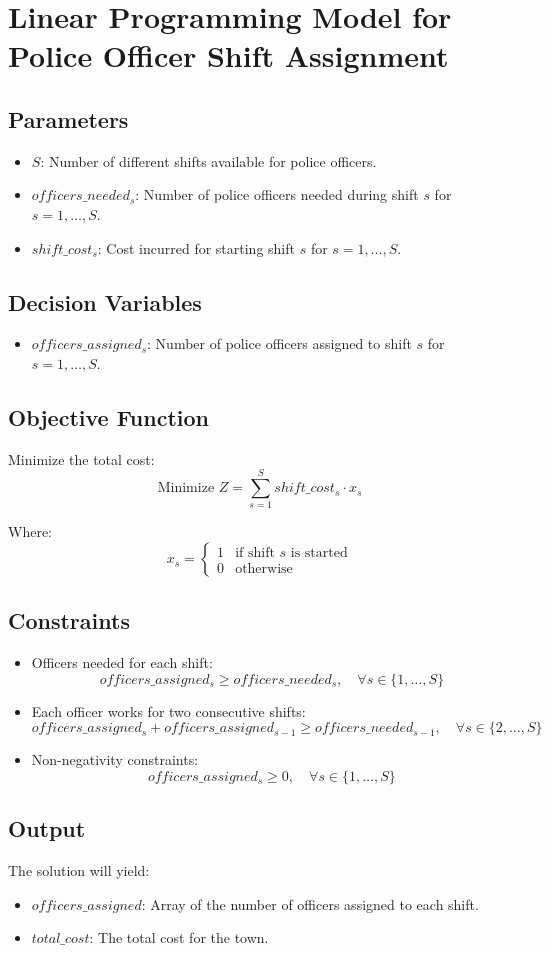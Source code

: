 \documentclass{article}
\begin{document}
\section*{Linear Programming Model for Police Officer Shift Assignment}

\subsection*{Parameters}
\begin{itemize}
    \item $S$: Number of different shifts available for police officers.
    \item $officers\_needed_{s}$: Number of police officers needed during shift $s$ for $s = 1, \ldots, S$.
    \item $shift\_cost_{s}$: Cost incurred for starting shift $s$ for $s = 1, \ldots, S$.
\end{itemize}

\subsection*{Decision Variables}
\begin{itemize}
    \item $officers\_assigned_{s}$: Number of police officers assigned to shift $s$ for $s = 1, \ldots, S$.
\end{itemize}

\subsection*{Objective Function}
Minimize the total cost:
\[
\text{Minimize } Z = \sum_{s=1}^{S} shift\_cost_{s} \cdot x_{s}
\]

Where:
\[
x_{s} = 
\begin{cases}
1 & \text{if shift } s \text{ is started} \\
0 & \text{otherwise}
\end{cases}
\]

\subsection*{Constraints}
\begin{itemize}
    \item Officers needed for each shift:
    \[
    officers\_assigned_{s} \geq officers\_needed_{s}, \quad \forall s \in \{1, \ldots, S\}
    \]
    
    \item Each officer works for two consecutive shifts:
    \[
    officers\_assigned_{s} + officers\_assigned_{s-1} \geq officers\_needed_{s-1}, \quad \forall s \in \{2, \ldots, S\}
    \]
    
    \item Non-negativity constraints:
    \[
    officers\_assigned_{s} \geq 0, \quad \forall s \in \{1, \ldots, S\}
    \]
\end{itemize}

\subsection*{Output}
The solution will yield:
\begin{itemize}
    \item $officers\_assigned$: Array of the number of officers assigned to each shift.
    \item $total\_cost$: The total cost for the town.
\end{itemize}
\end{document}
